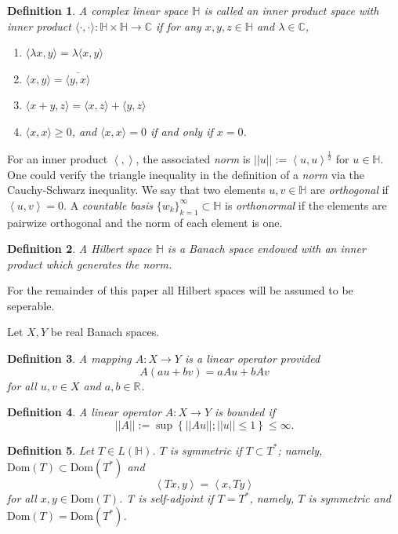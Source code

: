 \documentclass[12pt]{report}
\newtheorem{definition}{Definition}
\numberwithin{definition}{section}
\begin{document}
\begin{definition}
  A complex linear space $\mathbb{H}$ is called an inner product space with inner product $ \langle \cdot, \cdot \rangle  : \mathbb{H} \times \mathbb{H} \to \mathbb{C} $ if for any $x,y,z \in \mathbb{H}$ and $\lambda \in \mathbb{C}$,
  \begin{enumerate}
    \item $ \langle \lambda x, y \rangle = \lambda \langle x, y \rangle  $
    \item $ \langle x,y \rangle = \overline{ \langle y,x \rangle }$
    \item $ \langle x + y, z \rangle = \langle x,z \rangle + \langle y,z \rangle $
    \item $ \langle x,x \rangle \geq 0$, and $ \langle x,x \rangle = 0 $ if and only if $x = 0$.
  \end{enumerate}
\end{definition}

For an inner product $ \left< , \right>$, the associated \textit{norm} is $|| u || := \left< u,u \right>^{\frac{1}{2}}$ for $u \in \mathbb{H}$.
One could verify the triangle inequality in the definition of a \textit{norm} via the Cauchy-Schwarz inequality.
We say that two elements $u,v \in \mathbb{H}$ are \textit{orthogonal} if $\left< u,v \right> = 0$.
A \textit{countable basis} $\{w_{k}\}_{k=1}^\infty \subset \mathbb{H}$ is \textit{orthonormal} if the elements are pairwize orthogonal and the norm of each element is one.


\begin{definition}
  A Hilbert space $\mathbb{H}$ is a Banach space endowed with an inner product which generates the norm.
\end{definition}
For the remainder of this paper all Hilbert spaces will be assumed to be seperable.

Let $X,Y$ be real Banach spaces.
\begin{definition}
  A mapping $ A : X \to Y $ is a linear operator provided
  \[
  A(au + bv) = aAu + bAv
  \] 
  for all $u,v \in X$ and $a,b \in \mathbb{R}^{} $.
\end{definition}

\begin{definition}
  A linear operator $ A : X \to Y $ is bounded if 
  \[
  || A || := \sup \left\{ || Au ||; || u || \leq 1  \right\} \leq \infty
  .\] 
\end{definition}

\begin{definition}
  Let $T \in L(\mathbb{H})$. $T$ is symmetric if $T \subset T^{*}$; namely, $\text{Dom}(T) \subset \text{Dom}(T^{*})$ and 
  \[
  \left<Tx,y \right> = \left<x,Ty \right>
  \] 
  for all $x,y \in \text{Dom}(T)$. T is self-adjoint if $T = T^{*}$, namely, $T$ is symmetric and $\text{Dom}(T) = \text{Dom}(T^{*})$.
\end{definition}
\end{document}

